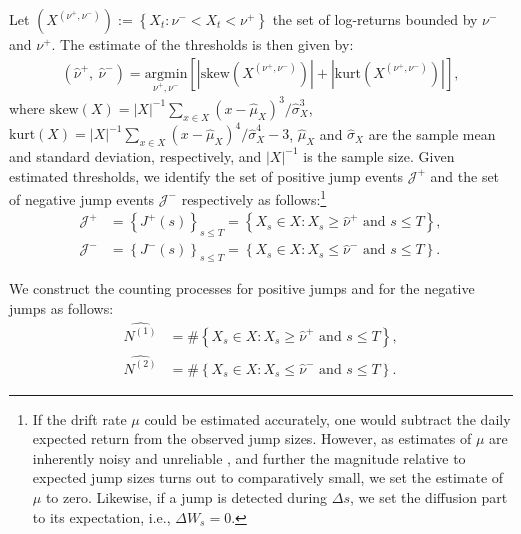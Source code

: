 \documentclass[11pt,a4paper]{article}
\numberwithin{equation}{section}
\theoremstyle{remark}
\theoremstyle{definition}
\begin{document}
Let $(X^{(\nu^+,\nu^-)}):=\left\{X_t: \nu^- < X_t < \nu^+\right\}$ the set of log-returns bounded by $\nu^-$ and $\nu^+$.
 The estimate of the thresholds is then given by:
 \begin{align}
  \left(\widehat\nu^+,\ \widehat\nu^-\right) = \underset{\nu^+, \nu^-}{\text{argmin}}  \left[
    |\text{skew}(X^{(\nu^+,\nu^-)})|+|\text{kurt}(X^{(\nu^+,\nu^-)})|
    \right],  \end{align}
 where $\text{skew}(X) = |X|^{-1}\sum_{x \in X}(x-\hat \mu_X)^3/\hat \sigma_X^3$,
       $\text{kurt}(X) = |X|^{-1}\sum_{x \in X}(x-\hat \mu_X)^4/\hat \sigma_X^4 - 3$,
      $\hat \mu_X$ and $\hat \sigma_X$ are the sample mean and standard deviation, respectively, and $|X|^{-1}$ is the sample size.
Given estimated thresholds, we identify the set of positive jump events $\mathcal{J}^+$ and the set of negative jump events $\mathcal{J}^-$ respectively as follows:\footnote{
    If the drift rate $\mu$ could be estimated accurately, one would subtract the daily expected return from the observed jump sizes. However, as estimates of $\mu$ are inherently noisy and unreliable \citep[e.g.][]{Merton1980,Jorion1999,AitSahalia1996}, and further the magnitude relative to expected jump sizes turns out to comparatively small, we set the estimate of $\mu$ to zero. Likewise, if a jump is detected during $\Delta s$, we set the diffusion part to its expectation, i.e., $\Delta W_s=0$.
}
\begin{equation}
    \begin{split}
    \mathcal{J}^+ &= \left\{J^+(s)\right\}_{s \leq T} = \left\{
      X_s \in X: X_s \geq \widehat\nu^+ \text{ and } s \leq T
      \right\},\\
      \mathcal{J}^- &= \left\{J^-(s)\right\}_{s \leq T} = \left\{
        X_s \in X: X_s \leq \widehat\nu^- \text{ and } s \leq T
        \right\}.
    \end{split}
\end{equation}

We construct the counting processes for positive jumps and for the negative jumps as follows:
\begin{equation}
    \begin{split}
    \widehat{N^{(1)}} &= \#\left\{
        X_s \in X: X_s \geq \widehat\nu^+ \text{ and } s \leq T
        \right\}, \\
    \widehat{N^{(2)}} &= \#\left\{
        X_s \in X: X_s \leq \widehat\nu^- \text{ and } s \leq T
        \right\}.
    \end{split}
\end{equation}
\end{document}
